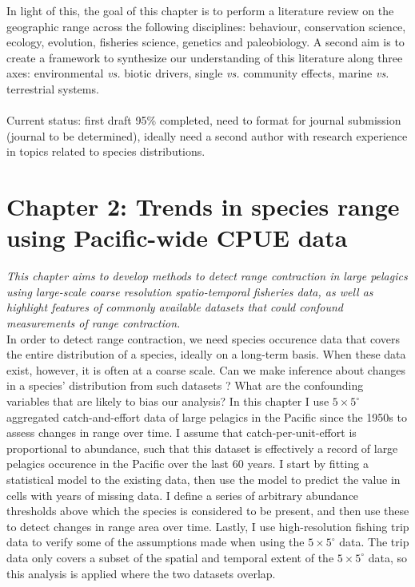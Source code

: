 \documentclass{article}
\newcommand{\griddef}[2]{$#1 \times #2^\circ$}
\begin{document}
In light of this, the goal of this chapter is to perform a
literature review on the geographic range across the following
disciplines: behaviour, conservation science, ecology, evolution,
fisheries science, genetics and paleobiology. A second aim is to
create a framework to synthesize our understanding of this
literature along three axes: environmental \emph{vs.} biotic
drivers, single \emph{vs.} community effects, marine \emph{vs.}
terrestrial systems.\\
\\
Current status: first draft 95\% completed, need to format for
journal submission (journal to be determined), ideally need a second
author with research experience in topics related to species
distributions.


\clearpage
\section*{Chapter 2: Trends in species range using Pacific-wide CPUE
  data}
\addtocounter{section}{1}
\emph{This chapter aims to develop methods to detect range contraction
  in large pelagics using large-scale coarse resolution spatio-temporal fisheries data,
  as well as highlight features of commonly available datasets that
  could confound measurements of range contraction.}\\

In order to detect range contraction, we need species occurence data that covers the entire
distribution of a species, ideally on a long-term basis. When
these data exist, however, it is often at a coarse scale. Can we make inference
about changes in a species' distribution from such datasets ? What are
the confounding variables that are likely to bias our analysis? In
this chapter I use \griddef{5}{5} aggregated catch-and-effort
data of large pelagics in the Pacific since the
1950s to assess changes in range over time. I assume that catch-per-unit-effort is proportional to
abundance, such that this dataset is effectively a record of large pelagics
occurence in the Pacific over the last 60 years. I start by fitting a statistical model to the existing
data, then use the model to predict the value in cells with years of
missing data. I define a series of arbitrary abundance thresholds above
which the species is considered to be present, and then use these to
detect changes in range area over time. Lastly, I use high-resolution
fishing trip data to verify some of the assumptions made when using
the \griddef{5}{5} data. The trip data only covers a subset of the spatial
and temporal extent of the \griddef{5}{5} data, so this analysis is
applied where the two datasets overlap.
\end{document}
